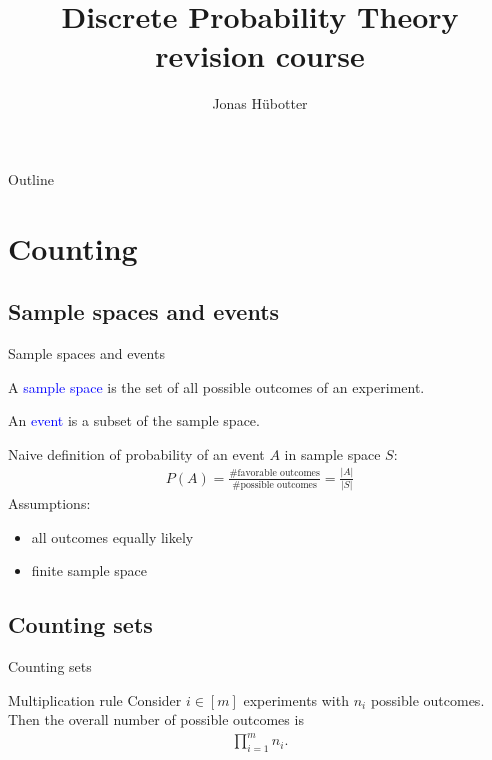 \documentclass{beamer}
\title[DWT revision course]{Discrete Probability Theory \\ revision course}
\author{Jonas Hübotter}
\def\padding{\vspace{0.5cm}}
\def\b{\textcolor{blue}}
\begin{document}
\begin{frame}
  \titlepage
\end{frame}

\begin{frame}{Outline}
 \tableofcontents[subsectionstyle=hide, subsubsectionstyle=hide]
\end{frame}

\section{Counting}

\subsection{Sample spaces and events}
\begin{frame}{Sample spaces and events}
    \begin{definition}
        A \b{sample space} is the set of all possible outcomes of an experiment.
    \end{definition}\pause
    \begin{definition}
        An \b{event} is a subset of the sample space.
    \end{definition}\pause\padding
    Naive definition of probability of an event $A$ in sample space $S$:\pause
    \begin{align*}
        P(A) = \frac{\text{\# favorable outcomes}}{\text{\# possible outcomes}} = \frac{|A|}{|S|}
    \end{align*}\pause
    Assumptions:\pause
    \begin{itemize}
        \item all outcomes equally likely\pause
        \item finite sample space
    \end{itemize}
\end{frame}

\subsection{Counting sets}
\begin{frame}{Counting sets}
    \begin{block}{Multiplication rule}
        Consider $i \in [m]$ experiments with $n_i$ possible outcomes. Then the overall number of possible outcomes is
        \begin{align*}
            \prod_{i=1}^m n_i.
        \end{align*}
    \end{block}
\end{frame}
\end{document}
